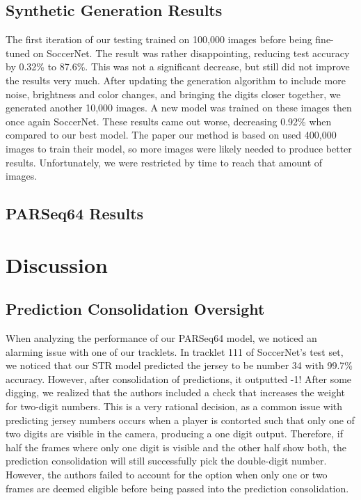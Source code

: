 \documentclass[11pt, letterpaper]{article}
\begin{document}
\subsection{Synthetic Generation Results}

The first iteration of our testing trained on 100,000 images before being fine-tuned on SoccerNet. The result was rather disappointing, reducing test accuracy by 0.32\% to 87.6\%. This was not a significant decrease, but still did not improve the results very much. After updating the generation algorithm to include more noise, brightness and color changes, and bringing the digits closer together, we generated another 10,000 images. A new model was trained on these images then once again SoccerNet. These results came out worse, decreasing 0.92\% when compared to our best model. The paper our method is based on used 400,000 images to train their model, so more images were likely needed to produce better results. Unfortunately, we were restricted by time to reach that amount of images.

\subsection{PARSeq64 Results}

\section{Discussion}

\subsection{Prediction Consolidation Oversight}

When analyzing the performance of our PARSeq64 model, we noticed an alarming issue with one of our tracklets. In tracklet 111 of SoccerNet's test set, we noticed that our STR model predicted the jersey to be number 34 with 99.7\% accuracy. However, after consolidation of predictions, it outputted -1! After some digging, we realized that the authors included a check that increases the weight for two-digit numbers. This is a very rational decision, as a common issue with predicting jersey numbers occurs when a player is contorted such that only one of two digits are visible in the camera, producing a one digit output. Therefore, if half the frames where only one digit is visible and the other half show both, the prediction consolidation will still successfully pick the double-digit number. However, the authors failed to account for the option when only one or two frames are deemed eligible before being passed into the prediction consolidation.
\end{document}
